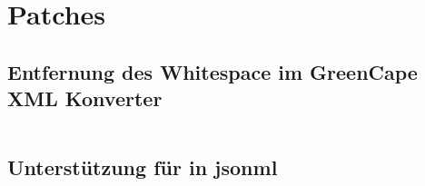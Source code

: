 \chapter{Patches}
\label{appx:patches}

\section{Entfernung des Whitespace im GreenCape XML Konverter}
\label{appx:greencapexml}

\inputminted[breakautoindent=false,fontsize=\footnotesize]{udiff}{patches/greencapexml-noindent.patch}

\section{Unterstützung für  in \acrshort{jsonml}}
\label{appx:jsonmlpi}

\inputminted[breakautoindent=false,fontsize=\footnotesize]{udiff}{patches/jsonml-pi.patch}
